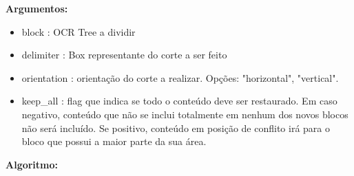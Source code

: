 \textbf{Argumentos:}
\begin{itemize}\setlength\itemsep{-0.3em}
	\item block : OCR Tree a dividir
	\item delimiter : Box representante do corte a ser feito
	\item orientation : orientação do corte a realizar. Opções: "horizontal", "vertical".
	\item keep\_all : flag que indica se todo o conteúdo deve ser restaurado. Em caso negativo, conteúdo que não se inclui totalmente em nenhum dos novos blocos não será incluído. Se positivo, conteúdo em posição de conflito irá para o bloco que possui a maior parte da sua área.
\end{itemize}

\textbf{Algoritmo:}

